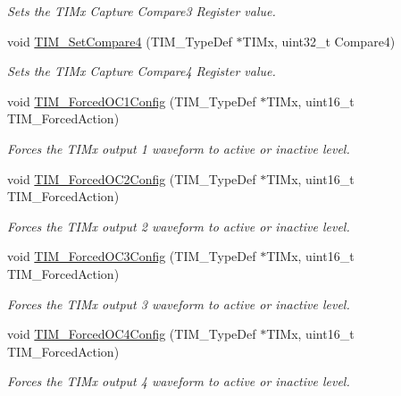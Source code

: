 \begin{DoxyCompactItemize}
\begin{DoxyCompactList}\small\item\em Sets the T\-I\-Mx Capture Compare3 Register value. \end{DoxyCompactList}\item 
void \hyperlink{group___t_i_m___group2_ga99ba6c2afa87a239c9d32a49762b4245}{T\-I\-M\-\_\-\-Set\-Compare4} (T\-I\-M\-\_\-\-Type\-Def $\ast$T\-I\-Mx, uint32\-\_\-t Compare4)
\begin{DoxyCompactList}\small\item\em Sets the T\-I\-Mx Capture Compare4 Register value. \end{DoxyCompactList}\item 
void \hyperlink{group___t_i_m___group2_ga4f58c12e6493a0d8b9555c9097b831d6}{T\-I\-M\-\_\-\-Forced\-O\-C1\-Config} (T\-I\-M\-\_\-\-Type\-Def $\ast$T\-I\-Mx, uint16\-\_\-t T\-I\-M\-\_\-\-Forced\-Action)
\begin{DoxyCompactList}\small\item\em Forces the T\-I\-Mx output 1 waveform to active or inactive level. \end{DoxyCompactList}\item 
void \hyperlink{group___t_i_m___group2_ga3d2902b6fbab8dd55cd531055ffcc63d}{T\-I\-M\-\_\-\-Forced\-O\-C2\-Config} (T\-I\-M\-\_\-\-Type\-Def $\ast$T\-I\-Mx, uint16\-\_\-t T\-I\-M\-\_\-\-Forced\-Action)
\begin{DoxyCompactList}\small\item\em Forces the T\-I\-Mx output 2 waveform to active or inactive level. \end{DoxyCompactList}\item 
void \hyperlink{group___t_i_m___group2_ga920b0fb4ca44fceffd1c3e441feebd8f}{T\-I\-M\-\_\-\-Forced\-O\-C3\-Config} (T\-I\-M\-\_\-\-Type\-Def $\ast$T\-I\-Mx, uint16\-\_\-t T\-I\-M\-\_\-\-Forced\-Action)
\begin{DoxyCompactList}\small\item\em Forces the T\-I\-Mx output 3 waveform to active or inactive level. \end{DoxyCompactList}\item 
void \hyperlink{group___t_i_m___group2_gaf0a0bbe74251e56d4b835d20b0a3aa63}{T\-I\-M\-\_\-\-Forced\-O\-C4\-Config} (T\-I\-M\-\_\-\-Type\-Def $\ast$T\-I\-Mx, uint16\-\_\-t T\-I\-M\-\_\-\-Forced\-Action)
\begin{DoxyCompactList}\small\item\em Forces the T\-I\-Mx output 4 waveform to active or inactive level. \end{DoxyCompactList}\item 

\end{DoxyCompactItemize}
